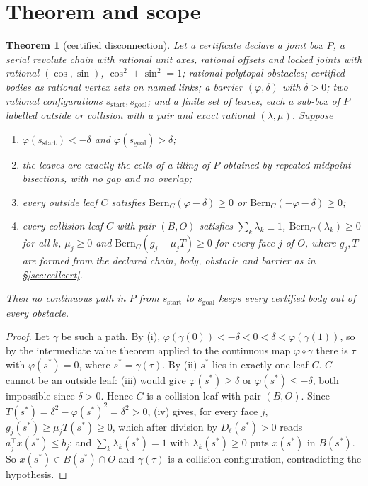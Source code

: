 \documentclass[10pt,twocolumn,letterpaper]{article}
\newtheorem{theorem}{Theorem}
\newcommand{\Bern}{\mathrm{Bern}}
\newcommand{\vphi}{\varphi}
\begin{document}
\section{Theorem and scope}\label{sec:theorem}

\begin{theorem}[certified disconnection]\label{thm:main}
Let a certificate declare a joint box $P$, a serial revolute chain with rational unit axes, rational offsets and locked joints with rational $(\cos,\sin)$, $\cos^2+\sin^2=1$; rational polytopal obstacles; certified bodies as rational vertex sets on named links; a barrier $(\vphi,\delta)$ with $\delta>0$; two rational configurations $s_{\mathrm{start}},s_{\mathrm{goal}}$; and a finite set of leaves, each a sub-box of $P$ labelled \emph{outside} or \emph{collision} with a pair and exact rational $(\lambda,\mu)$. Suppose
\begin{enumerate}[label=(\roman*)]
\item $\vphi(s_{\mathrm{start}})<-\delta$ and $\vphi(s_{\mathrm{goal}})>\delta$;
\item the leaves are exactly the cells of a tiling of $P$ obtained by repeated midpoint bisections, with no gap and no overlap;
\item every outside leaf $C$ satisfies $\Bern_C(\vphi-\delta)\ge0$ or $\Bern_C(-\vphi-\delta)\ge0$;
\item every collision leaf $C$ with pair $(B,O)$ satisfies $\sum_k\lambda_k\equiv1$, $\Bern_C(\lambda_k)\ge0$ for all $k$, $\mu_j\ge0$ and $\Bern_C(g_j-\mu_jT)\ge0$ for every face $j$ of $O$, where $g_j,T$ are formed from the declared chain, body, obstacle and barrier as in \S\ref{sec:cellcert}.
\end{enumerate}
Then no continuous path in $P$ from $s_{\mathrm{start}}$ to $s_{\mathrm{goal}}$ keeps every certified body out of every obstacle.
\end{theorem}
\begin{proof}
Let $\gamma$ be such a path. By (i), $\vphi(\gamma(0))<-\delta<0<\delta<\vphi(\gamma(1))$, so by the intermediate value theorem applied to the continuous map $\vphi\circ\gamma$ there is $\tau$ with $\vphi(s^*)=0$, where $s^*=\gamma(\tau)$. By (ii) $s^*$ lies in exactly one leaf $C$. $C$ cannot be an outside leaf: (iii) would give $\vphi(s^*)\ge\delta$ or $\vphi(s^*)\le-\delta$, both impossible since $\delta>0$. Hence $C$ is a collision leaf with pair $(B,O)$. Since $T(s^*)=\delta^2-\vphi(s^*)^2=\delta^2>0$, (iv) gives, for every face $j$, $g_j(s^*)\ge\mu_jT(s^*)\ge0$, which after division by $D_\ell(s^*)>0$ reads $a_j^{\top}x(s^*)\le b_j$; and $\sum_k\lambda_k(s^*)=1$ with $\lambda_k(s^*)\ge0$ puts $x(s^*)$ in $B(s^*)$. So $x(s^*)\in B(s^*)\cap O$ and $\gamma(\tau)$ is a collision configuration, contradicting the hypothesis.
\end{proof}
\end{document}
